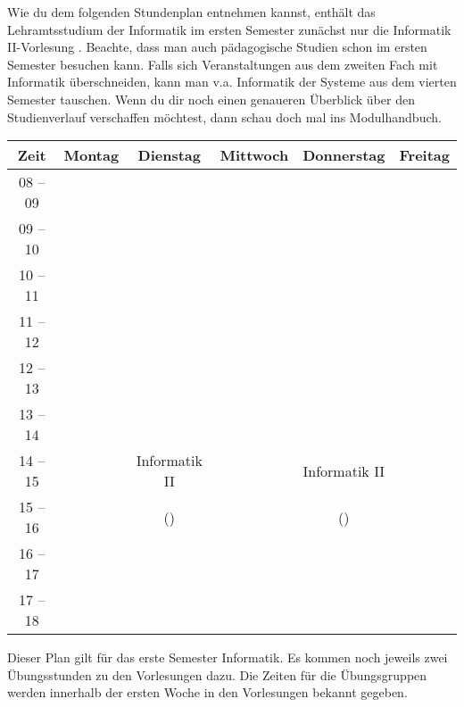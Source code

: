 Wie du dem folgenden Stundenplan entnehmen kannst, enthält das Lehramtsstudium der Informatik im ersten Semester zunächst nur die Informatik II-Vorlesung . %
Beachte, dass man auch pädagogische Studien schon im ersten Semester besuchen kann. Falls sich Veranstaltungen aus dem zweiten
Fach mit Informatik überschneiden, kann man v.a. Informatik der Systeme aus dem vierten Semester tauschen.
Wenn du dir noch einen genaueren Überblick über den Studienverlauf verschaffen möchtest, dann schau doch mal ins Modulhandbuch.

\begin{center}
	\begin{tabular}{|c|c|c|c|c|c|} \hline
		Zeit      & 			Montag 		& Dienstag			& Mittwoch 			& Donnerstag 			& Freitag	 \\
		\hline\hline
		08 -- 09  &	& &	& &			\\
		\hline
		09 -- 10  & & & & &			\\
		\hline
		10 -- 11  &	& &	& &			\\
		\hline
		11 -- 12 & 	&  					&					&			 			& 			\\
		\hline
		12 -- 13 & 							& 				 	& 				    & 						& 			 \\
		\hline
		13 -- 14 & 							& 					& 	& 						& 			 \\
		\hline
		14 -- 15 & 							& Informatik II 		& 					& Informatik II 			& 				\\
		\cline{1-2}\cline{4-4}\cline{6-6}
		15 -- 16 &							 & (\Infoprof) 	& 					& (\Infoprof) 		& 				\\
		\hline
		16 -- 17 & & & & &\\
		\hline
		17 -- 18 & & & & & \\
		\hline
	\end{tabular}


\end{center}

Dieser Plan gilt für das erste Semester Informatik. Es kommen noch jeweils zwei Übungsstunden zu den Vorlesungen dazu.
Die Zeiten für die Übungsgruppen werden innerhalb der ersten Woche in den Vorlesungen bekannt gegeben. \\
